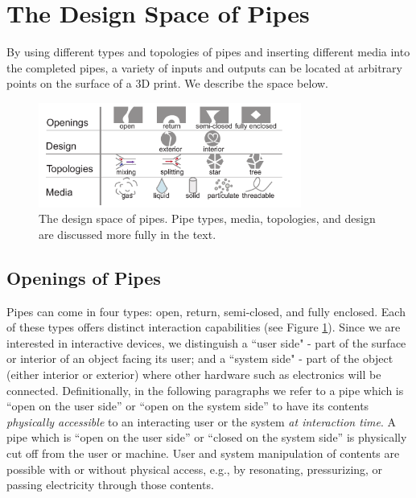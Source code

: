 \section{The Design Space of Pipes}
By using different types and topologies of pipes and inserting different media into the completed pipes, a variety of inputs and outputs can be located at arbitrary points on the surface of a 3D print.  We describe the space below.

\begin{figure}[h!]
\centering
    \includegraphics[width=3.4in]{figures/tubespace.pdf}
\caption{The design space of pipes.  Pipe types, media, topologies, and design are discussed more fully in the text.}
\label{fig:pipespace}
\end{figure}

\subsection{Openings of Pipes}

Pipes can come in four types: open, return, semi-closed, and fully enclosed.  Each of these types offers distinct interaction capabilities (see Figure \ref{fig:pipespace}).  Since we are interested in interactive devices, we distinguish a ``user side" - part of the surface or interior of an object facing its user; and a ``system side" - part of the object (either interior or exterior) where other hardware such as electronics will be connected.  Definitionally, in the following paragraphs we refer to a pipe which is ``open on the user side'' or ``open on the system side'' to have its contents \emph{physically accessible} to an interacting user or the system \emph{at interaction time}.  A pipe which is ``open on the user side'' or ``closed on the system side'' is physically cut off from the user or machine.  User and system manipulation of contents are possible with or without physical access, e.g., by resonating, pressurizing, or passing electricity through those contents.

